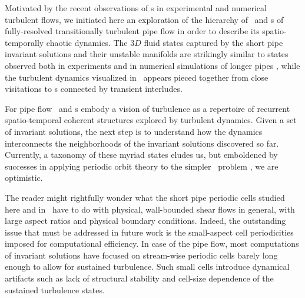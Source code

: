 \documentclass{jfm}
\begin{document}
Motivated by the recent observations of \recurrStr s in experimental and
numerical turbulent flows, we initiated here an exploration of the
hierarchy of \reqva\ and \rpo s of fully-resolved transitionally
turbulent pipe flow in order to describe its spatio-temporally chaotic
dynamics. The $3D$ fluid states captured by the short pipe invariant
solutions and their unstable manifolds are strikingly similar to states
observed both in experiments and in numerical simulations of longer pipes
, while the turbulent dynamics visualized in \statesp\
appears pieced together from close visitations to \cohStr s connected by
transient interludes.

For pipe flow \reqva\ and \rpo s embody a vision of turbulence as a
repertoire of recurrent spatio-temporal coherent structures explored by
turbulent dynamics. Given a set of invariant solutions, the next
step is to understand how the dynamics interconnects the neighborhoods of
the invariant solutions discovered so far.
Currently, a taxonomy of these myriad states eludes us, but emboldened by
successes in applying periodic orbit theory to the simpler \KS\ problem
\rf{Christiansen97,lanCvit07,SCD07}, we are optimistic.

The reader might rightfully wonder what the short pipe periodic cells
studied here and in \pCf\ have to do with physical,
wall-bounded shear flows in general, with large aspect ratios and
physical boundary conditions. Indeed, the outstanding issue
that must be addressed in future work is the small-aspect cell
periodicities imposed for computational efficiency. In case of the pipe
flow, most computations of invariant solutions have focused on
stream-wise periodic cells barely long enough to allow for sustained
turbulence. Such small cells introduce dynamical artifacts such as lack
of structural stability and cell-size dependence of the sustained
turbulence states.
\end{document}
